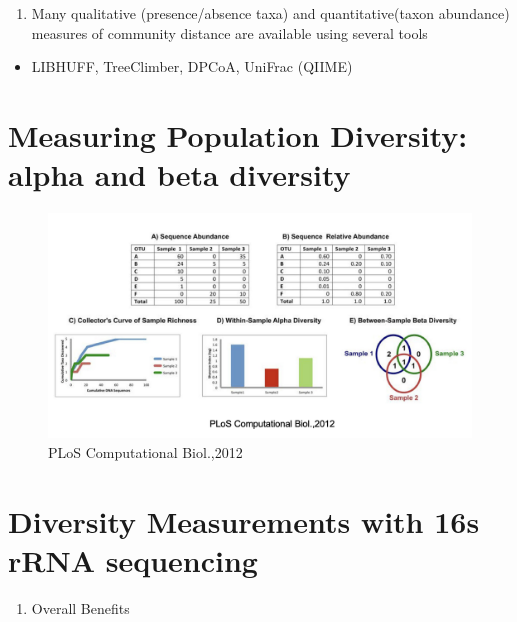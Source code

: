 \documentclass[
]{book}
\providecommand{\tightlist}{%
  \setlength{\itemsep}{0pt}\setlength{\parskip}{0pt}}
\begin{document}
\begin{enumerate}
\def\labelenumi{\arabic{enumi}.}
\setcounter{enumi}{1}
\tightlist
\item
  Many qualitative (presence/absence taxa) and
  quantitative(taxon abundance) measures of community
  distance are available using several tools
\end{enumerate}

\begin{itemize}
\tightlist
\item
  LIBHUFF, TreeClimber, DPCoA, UniFrac (QIIME)
\end{itemize}

\hypertarget{measuring-population-diversity-alpha-and-beta-diversity}{%
\section{\texorpdfstring{Measuring Population Diversity: \textbf{alpha and beta diversity}}{Measuring Population Diversity: alpha and beta diversity}}\label{measuring-population-diversity-alpha-and-beta-diversity}}

\begin{figure}
\centering
\includegraphics[width=1\textwidth,height=\textheight]{./Figures/Diversity2.png}
\caption{PLoS Computational Biol.,2012}
\end{figure}

\hypertarget{diversity-measurements-with-16s-rrna-sequencing}{%
\section{Diversity Measurements with 16s rRNA sequencing}\label{diversity-measurements-with-16s-rrna-sequencing}}

\begin{enumerate}
\def\labelenumi{\arabic{enumi}.}
\tightlist
\item
  Overall Benefits
\end{enumerate}
\end{document}
